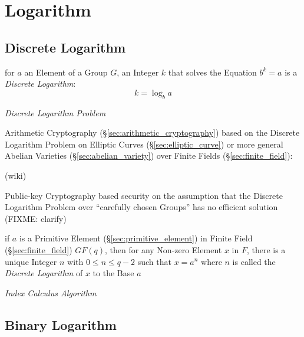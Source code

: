 \section{Logarithm}\label{sec:logarithm}

\subsection{Discrete Logarithm}\label{sec:discrete_logarithm}

for $a$ an Element of a Group $G$, an Integer $k$ that solves the Equation $b^k
= a$ is a \emph{Discrete Logarithm}:
\[
  k = \log_b a
\]

\emph{Discrete Logarithm Problem}

\fist Arithmetic Cryptography (\S\ref{sec:arithmetic_cryptography}) based on
the Discrete Logarithm Problem on Elliptic Curves (\S\ref{sec:elliptic_curve})
or more general Abelian Varieties (\S\ref{sec:abelian_variety}) over Finite
Fields (\S\ref{sec:finite_field}):

(wiki)

Public-key Cryptography based security on the assumption that the Discrete
Logarithm Problem over ``carefully chosen Groups'' has no efficient solution
(FIXME: clarify)

if $a$ is a Primitive Element (\S\ref{sec:primitive_element}) in Finite Field
(\S\ref{sec:finite_field}) $GF(q)$, then for any Non-zero Element $x$ in $F$,
there is a unique Integer $n$ with $0 \leq n \leq q - 2$ such that $x = a^n$
where $n$ is called the \emph{Discrete Logarithm} of $x$ to the Base $a$

\emph{Index Calculus Algorithm}



\subsection{Binary Logarithm}\label{sec:binary_logarithm}

